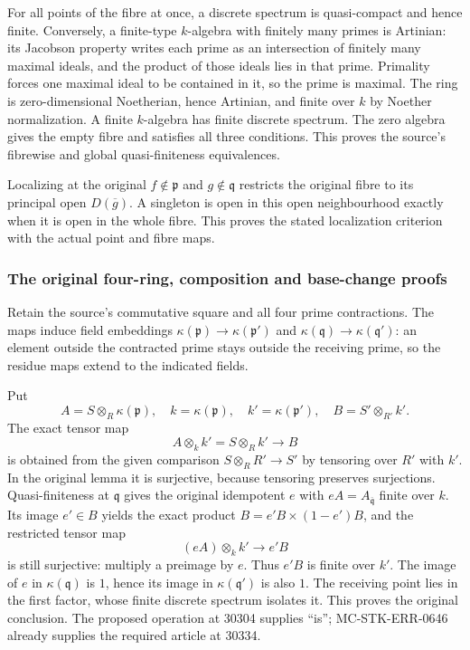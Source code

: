 For all points of the fibre at once, a discrete spectrum is quasi-compact and hence finite. Conversely, a finite-type \(k\)-algebra with finitely many primes is Artinian: its Jacobson property writes each prime as an intersection of finitely many maximal ideals, and the product of those ideals lies in that prime. Primality forces one maximal ideal to be contained in it, so the prime is maximal. The ring is zero-dimensional Noetherian, hence Artinian, and finite over \(k\) by Noether normalization. A finite \(k\)-algebra has finite discrete spectrum. The zero algebra gives the empty fibre and satisfies all three conditions. This proves the source's fibrewise and global quasi-finiteness equivalences.

Localizing at the original \(f\notin\mathfrak p\) and \(g\notin\mathfrak q\) restricts the original fibre to its principal open \(D(\overline g)\). A singleton is open in this open neighbourhood exactly when it is open in the whole fibre. This proves the stated localization criterion with the actual point and fibre maps.

\subsubsection{The original four-ring, composition and base-change proofs}\label{algebra-proof-031-the-original-four-ring-composition-and-base-change-proofs}

Retain the source's commutative square and all four prime contractions. The maps induce field embeddings \(\kappa(\mathfrak p)\to\kappa(\mathfrak p')\) and \(\kappa(\mathfrak q)\to\kappa(\mathfrak q')\): an element outside the contracted prime stays outside the receiving prime, so the residue maps extend to the indicated fields.

Put \[
 A=S\otimes_R\kappa(\mathfrak p),\quad
 k=\kappa(\mathfrak p),\quad k'=\kappa(\mathfrak p'),\quad
 B=S'\otimes_{R'}k'.
\] The exact tensor map \[
 A\otimes_k k'=S\otimes_R k'\longrightarrow B
\] is obtained from the given comparison \(S\otimes_RR'\to S'\) by tensoring over \(R'\) with \(k'\). In the original lemma it is surjective, because tensoring preserves surjections. Quasi-finiteness at \(\mathfrak q\) gives the original idempotent \(e\) with \(eA=A_{\overline{\mathfrak q}}\) finite over \(k\). Its image \(e'\in B\) yields the exact product \(B=e'B\times(1-e')B\), and the restricted tensor map \[
 (eA)\otimes_k k'\longrightarrow e'B
\] is still surjective: multiply a preimage by \(e\). Thus \(e'B\) is finite over \(k'\). The image of \(e\) in \(\kappa(\mathfrak q)\) is \(1\), hence its image in \(\kappa(\mathfrak q')\) is also \(1\). The receiving point lies in the first factor, whose finite discrete spectrum isolates it. This proves the original conclusion. The proposed operation at 30304 supplies ``is''; MC-\AlgebraIdentifierBreak{}STK-\AlgebraIdentifierBreak{}ERR-\AlgebraIdentifierBreak{}0646 already supplies the required article at 30334.

